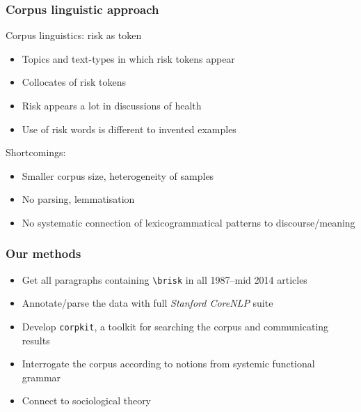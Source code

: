 \documentclass{beamer}       %
\begin{document}
\begin{frame}
    \frametitle{Corpus linguistic approach}

    Corpus linguistics: risk as token \cite{hamilton_meanings_2007}

    \begin{itemize}
    \item Topics and text-types in which risk tokens appear
    \item Collocates of risk tokens
    \item Risk appears a lot in discussions of health
    \item Use of risk words is different to invented examples
    \end{itemize}

    Shortcomings:

    \begin{itemize}
        \item Smaller corpus size, heterogeneity of samples
        \item No parsing, lemmatisation
        \item No systematic connection of lexicogrammatical patterns to discourse\slash meaning
    \end{itemize}

\end{frame}

\begin{frame}
    \frametitle{Our methods}
    
    \begin{itemize}
    \item Get all paragraphs containing \texttt{\textbackslash brisk} in all 1987--mid 2014 articles
    \item Annotate\slash parse the data with full \emph{Stanford CoreNLP} suite
    \item Develop \texttt{corpkit}, a toolkit for searching the corpus and communicating results
    \item Interrogate the corpus according to notions from systemic functional grammar
    \item Connect to sociological theory
    \end{itemize}
\end{frame}
\end{document}
